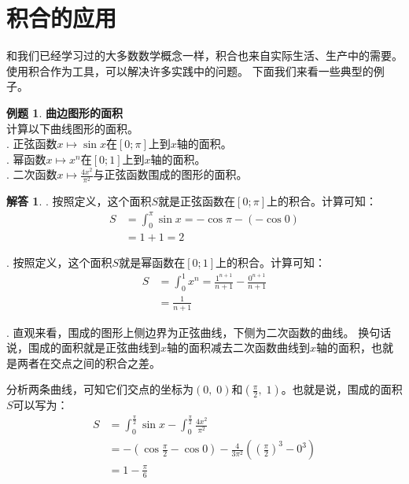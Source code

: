 \documentclass[12pt,UTF8]{ctexbook}
\theoremstyle{definition}
\newtheorem{et}{例题}[section]
\newtheorem*{so}{解答}
\theoremstyle{plain}
\begin{document}
\section{积合的应用}

和我们已经学习过的大多数数学概念一样，积合也来自实际生活、生产中的需要。使用积合作为工具，可以解决许多实践中的问题。
下面我们来看一些典型的例子。

\begin{et}{\textbf{曲边图形的面积}}\\
    计算以下曲线图形的面积。\\
    . 正弦函数$x\mapsto \sin{x}$在$[0;\pi]$上到$x$轴的面积。 \\
    . 幂函数$x\mapsto x^n$在$[0;1]$上到$x$轴的面积。\\
    . 二次函数$x \mapsto \frac{4x^2}{\pi^2}$与正弦函数围成的图形的面积。
\end{et}

\begin{so}
    . 按照定义，这个面积$S$就是正弦函数在$[0;\pi]$上的积合。计算可知：
    \begin{align*}
        S &= \int_{0}^{\pi} \sin{x} = -\cos{\pi} - (-\cos{0}) \\
        &= 1 + 1 = 2
    \end{align*}

    . 按照定义，这个面积$S$就是幂函数在$[0;1]$上的积合。计算可知：
    \begin{align*}
        S &= \int_{0}^{1} x^n = \frac{1^{n+1}}{n+1}- \frac{0^{n+1}}{n+1} \\
        &= \frac{1}{n+1}
    \end{align*}

    . 直观来看，围成的图形上侧边界为正弦曲线，下侧为二次函数的曲线。
    换句话说，围成的面积就是正弦曲线到$x$轴的面积减去二次函数曲线到$x$轴的面积，也就是两者在交点之间的积合之差。

    \indent 分析两条曲线，可知它们交点的坐标为$(0,\;0)$和$\left(\frac{\pi}{2},\;1\right)$。也就是说，围成的面积$S$可以写为：
    \begin{align*}
        S &= \int_{0}^{\frac{\pi}{2}} \sin{x} - \int_{0}^{\frac{\pi}{2}} \frac{4x^2}{\pi^2} \\ 
        &= -\left(\cos{\frac{\pi}{2}} - \cos{0}\right) - \frac{4}{3\pi^2} \left( \left( \frac{\pi}{2} \right)^3 - 0^3 \right) \\
        &= 1 - \frac{\pi}{6}
    \end{align*}
\end{so}
\end{document}
